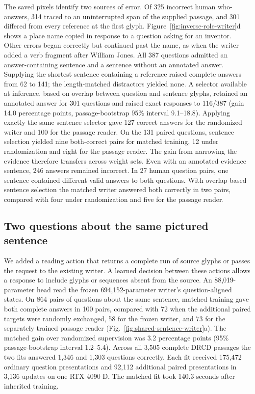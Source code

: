 \documentclass[12pt,a4paper]{article}
\providecommand{\DIFadd}[1]{{\protect\color{blue} \sf #1}} %
\begin{document}
\DIFadd{The saved pixels identify two sources of error. Of 325 incorrect human who-answers, 314 traced to an uninterrupted span of the supplied passage, and 301 differed from every reference at the first glyph. Figure~\ref{fig:inverse-role-writer}d shows a place name copied in response to a question asking for an inventor. Other errors began correctly but continued past the name, as when the writer added a verb fragment after William Jones. All 387 questions admitted an answer-containing sentence and a sentence without an annotated answer. Supplying the shortest sentence containing a reference raised complete answers from 62 to 141; the length-matched distractors yielded none. A selector available at inference, based on overlap between question and sentence glyphs, retained an annotated answer for 301 questions and raised exact responses to 116/387 (gain 14.0 percentage points, passage-bootstrap 95\% interval 9.1--18.8). Applying exactly the same sentence selector gave 127 correct answers for the randomized writer and 100 for the passage reader. On the 131 paired questions, sentence selection yielded nine both-correct pairs for matched training, 12 under randomization and eight for the passage reader. The gain from narrowing the evidence therefore transfers across weight sets. Even with an annotated evidence sentence, 246 answers remained incorrect. In 27 human question pairs, one sentence contained different valid answers to both questions. With overlap-based sentence selection the matched writer answered both correctly in two pairs, compared with four under randomization and five for the passage reader.
}

\subsection*{\DIFadd{Two questions about the same pictured sentence}}
\DIFadd{We added a reading action that returns a complete run of source glyphs or passes the request to the existing writer. A learned decision between these actions allows a response to include glyphs or sequences absent from the source. An 88,019-parameter head read the frozen 694,152-parameter writer's question-aligned states. On 864 pairs of questions about the same sentence, matched training gave both complete answers in 100 pairs, compared with 72 when the additional paired targets were randomly exchanged, 58 for the frozen writer, and 73 for the separately trained passage reader (Fig.~\ref{fig:shared-sentence-writer}a). The matched gain over randomized supervision was 3.2 percentage points (95\% passage-bootstrap interval 1.2--5.4). Across all 3,505 complete DRCD passages the two fits answered 1,346 and 1,303 questions correctly. Each fit received 175,472 ordinary question presentations and 92,112 additional paired presentations in 3,136 updates on one RTX 4090 D. The matched fit took 140.3 seconds after inherited training.
}
\end{document}
